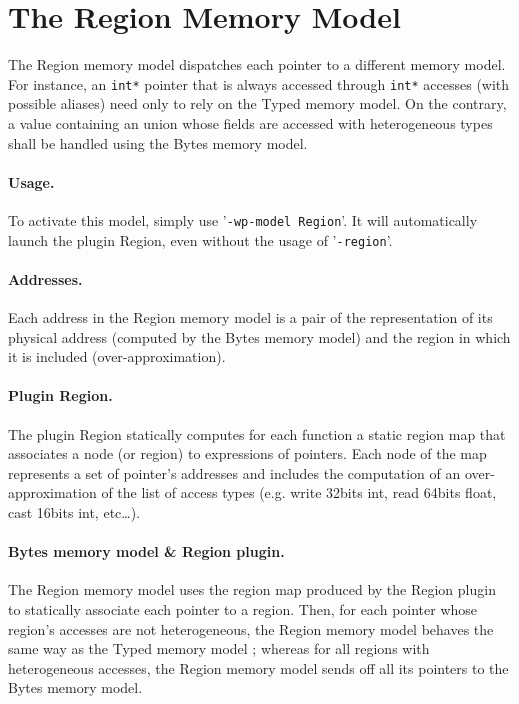 
\section{The Region Memory Model}
\label{sec:region-model}

The Region memory model dispatches each pointer to a different memory model.
For instance, an \texttt{int*} pointer that is always accessed through
\texttt{int*} accesses (with possible aliases) need only to rely on the Typed
memory model. On the contrary, a value containing an union whose fields are
accessed with heterogeneous types shall be handled using the Bytes memory model.

\paragraph{Usage.} To activate this model, simply use '\texttt{-wp-model Region}'.
It will automatically launch the plugin Region, even without the usage of
'\texttt{-region}'.

\paragraph{Addresses.} Each address in the Region memory model is a pair of
the representation of its physical address (computed by the Bytes memory
model) and the region in which it is included (over-approximation).

\paragraph{Plugin Region.}
The plugin Region statically computes for each function a static region
map that associates a node (or region) to expressions of pointers. Each
node of the map represents a set of pointer's addresses and includes
the computation of an over-approximation of the list of access types
(e.g. write 32bits int, read 64bits float, cast 16bits int, etc\dots).

\paragraph{Bytes memory model \& Region plugin.}
The Region memory model uses the region map produced by the Region
plugin to statically associate each pointer to a region. Then, for each
pointer whose region's accesses are not heterogeneous, the Region memory
model behaves the same way as the Typed memory model ; whereas for all
regions with heterogeneous accesses, the Region memory model sends off all
its pointers to the Bytes memory model.

